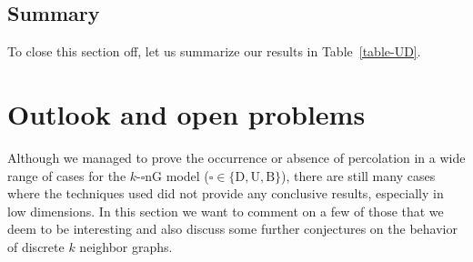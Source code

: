 \documentclass[a4paper, oneside, 11pt]{amsart}
\theoremstyle{definition}
\newcommand{\1}{\mathbbm{1}}
\newcommand{\0}{\mathbf{o}}
\numberwithin{equation}{section}
\begin{document}
\subsection{Summary}
To close this section off, let us summarize our results in Table~\ref{table-UD}. 
\begin{table}[h]
\centering
{}
\caption{Percolation results and open cases for the BnG/DnG/UnG. For given $k,d$, `yes' means that the given graph percolates, `no' means that it does not, while `open' means that the given case is (at least partially) open.}
\label{table-UD}
\end{table}


\section{Outlook and open problems}\label{sec:discussion}
Although we managed to prove the occurrence or absence of percolation in a wide range of cases for the $k$-$\square$nG model ($\square\in\{\mathrm{D,U,B}\}$), there are still many cases where the techniques used did not provide any conclusive results, especially in low dimensions. In this section we want to comment on a few of those that we deem to be interesting and also discuss some further conjectures on the behavior of discrete $k$  neighbor graphs. 
\end{document}
